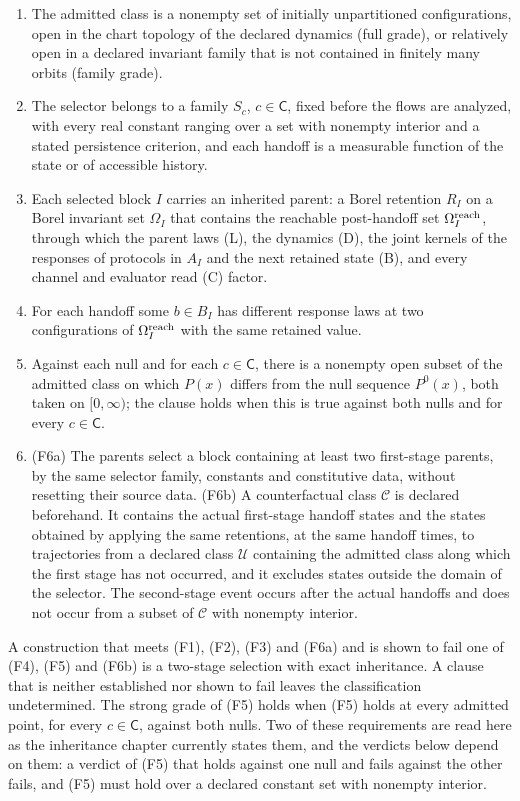 \documentclass[11pt,letterpaper]{report}
\begin{document}
\begin{enumerate}
\item[(F1)] The admitted class is a nonempty set of initially unpartitioned configurations, open in the chart topology of the declared dynamics (full grade), or relatively open in a declared invariant family that is not contained in finitely many orbits (family grade).
\item[(F2)] The selector belongs to a family $S_c$, $c\in\mathsf C$, fixed before the flows are analyzed, with every real constant ranging over a set with nonempty interior and a stated persistence criterion, and each handoff is a measurable function of the state or of accessible history.
\item[(F3)] Each selected block $I$ carries an inherited parent: a Borel retention $R_I$ on a Borel invariant set $\Omega_I$ that contains the reachable post-handoff set $\Omega_I^{\rm reach}$, through which the parent laws (L), the dynamics (D), the joint kernels of the responses of protocols in $A_I$ and the next retained state (B), and every channel and evaluator read (C) factor.
\item[(F4)] For each handoff some $b\in B_I$ has different response laws at two configurations of $\Omega_I^{\rm reach}$ with the same retained value.
\item[(F5)] Against each null and for each $c\in\mathsf C$, there is a nonempty open subset of the admitted class on which $P(x)$ differs from the null sequence $P^0(x)$, both taken on $[0,\infty)$; the clause holds when this is true against both nulls and for every $c\in\mathsf C$.
\item[(F6)] (F6a) The parents select a block containing at least two first-stage parents, by the same selector family, constants and constitutive data, without resetting their source data. (F6b) A counterfactual class $\mathcal C$ is declared beforehand. It contains the actual first-stage handoff states and the states obtained by applying the same retentions, at the same handoff times, to trajectories from a declared class $\mathcal U$ containing the admitted class along which the first stage has not occurred, and it excludes states outside the domain of the selector. The second-stage event occurs after the actual handoffs and does not occur from a subset of $\mathcal C$ with nonempty interior.
\end{enumerate}
A construction that meets (F1), (F2), (F3) and (F6a) and is shown to fail one of (F4), (F5) and (F6b) is a two-stage selection with exact inheritance. A clause that is neither established nor shown to fail leaves the classification undetermined. The strong grade of (F5) holds when (F5) holds at every admitted point, for every $c\in\mathsf C$, against both nulls. Two of these requirements are read here as the inheritance chapter currently states them, and the verdicts below depend on them: a verdict of (F5) that holds against one null and fails against the other fails, and (F5) must hold over a declared constant set with nonempty interior.
\end{document}
